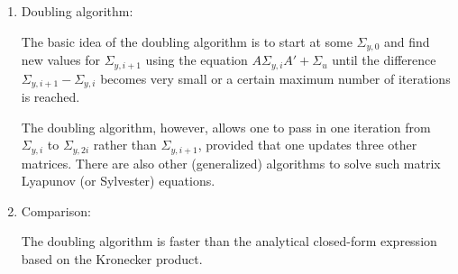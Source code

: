 \begin{enumerate}
\begin{enumerate}
\item Doubling algorithm:

The basic idea of the doubling algorithm is to start at some \(\Sigma_{y,0}\)
  and find new values for \(\Sigma_{y,i+1}\) using the equation \(A \Sigma_{y,i} A' + \Sigma_u\)
  until the difference \(\Sigma_{y,i+1} - \Sigma_{y,i}\) becomes very small
  or a certain maximum number of iterations is reached.

The doubling algorithm, however, allows one to pass in one iteration
  from \(\Sigma_{y,i}\) to \(\Sigma_{y,2i}\) rather than \(\Sigma_{y,i+1}\),
  provided that one updates three other matrices.
There are also other (generalized) algorithms to solve such matrix Lyapunov (or Sylvester) equations.

\item Comparison:

The doubling algorithm is faster than the analytical closed-form expression based on the Kronecker product.
\end{enumerate}

\end{enumerate}